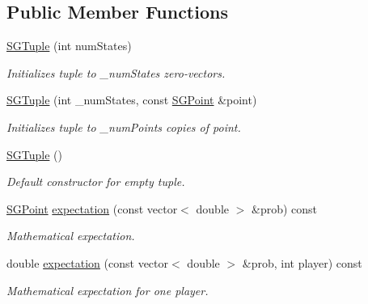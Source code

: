 \subsection*{Public Member Functions}
\begin{DoxyCompactItemize}
\item 
\mbox{\label{classSGTuple_a7159656a9fbec24b5b6c94dbfec1ffd1}} 
\hyperlink{classSGTuple_a7159656a9fbec24b5b6c94dbfec1ffd1}{S\+G\+Tuple} (int num\+States)
\begin{DoxyCompactList}\small\item\em Initializes tuple to \+\_\+num\+States zero-\/vectors. \end{DoxyCompactList}\item 
\mbox{\label{classSGTuple_a37adecb17ef12a7c1a4cb14bb89ce59f}} 
\hyperlink{classSGTuple_a37adecb17ef12a7c1a4cb14bb89ce59f}{S\+G\+Tuple} (int \+\_\+num\+States, const \hyperlink{classSGPoint}{S\+G\+Point} \&point)
\begin{DoxyCompactList}\small\item\em Initializes tuple to \+\_\+num\+Points copies of point. \end{DoxyCompactList}\item 
\mbox{\label{classSGTuple_a1aacff0823f75661729104f8d232fcbf}} 
\hyperlink{classSGTuple_a1aacff0823f75661729104f8d232fcbf}{S\+G\+Tuple} ()
\begin{DoxyCompactList}\small\item\em Default constructor for empty tuple. \end{DoxyCompactList}\item 
\hyperlink{classSGPoint}{S\+G\+Point} \hyperlink{classSGTuple_a14d24373f31ea778f4beeff688b6e4d0}{expectation} (const vector$<$ double $>$ \&prob) const
\begin{DoxyCompactList}\small\item\em Mathematical expectation. \end{DoxyCompactList}\item 
double \hyperlink{classSGTuple_aadc035860158d0e57acbaef6c56265d9}{expectation} (const vector$<$ double $>$ \&prob, int player) const
\begin{DoxyCompactList}\small\item\em Mathematical expectation for one player. \end{DoxyCompactList}\item 

\end{DoxyCompactItemize}
